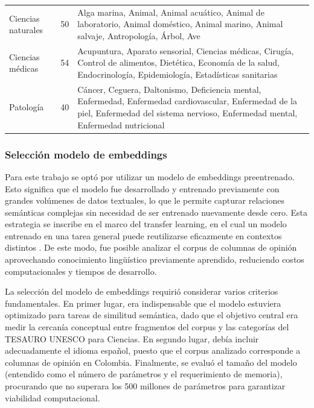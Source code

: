 \documentclass[11pt,a4paper]{article}
\begin{document}
{\begin{longtable}{p{3.5cm}P{2cm}p{9cm}}
			Ciencias naturales & 50 & Alga marina, Animal, Animal acuático, Animal de laboratorio, Animal doméstico, Animal marino, Animal salvaje, Antropología, Árbol, Ave \\
			
			Ciencias médicas & 54 & Acupuntura, Aparato sensorial, Ciencias médicas, Cirugía, Control de alimentos, Dietética, Economía de la salud, Endocrinología, Epidemiología, Estadísticas sanitarias \\
			
			Patología & 40 & Cáncer, Ceguera, Daltonismo, Deficiencia mental, Enfermedad, Enfermedad cardiovascular, Enfermedad de la piel, Enfermedad del sistema nervioso, Enfermedad mental, Enfermedad nutricional \\
			
		\end{longtable}
	}
	
	
	\subsubsection{Selección modelo de embeddings}
Para este trabajo se optó por utilizar un modelo de embeddings preentrenado. Esto significa que el modelo fue desarrollado y entrenado previamente con grandes volúmenes de datos textuales, lo que le permite capturar relaciones semánticas complejas sin necesidad de ser entrenado nuevamente desde cero. Esta estrategia se inscribe en el marco del transfer learning, en el cual un modelo entrenado en una tarea general puede reutilizarse eficazmente en contextos distintos \cite{Hosna2022}. De este modo, fue posible analizar el corpus de columnas de opinión aprovechando conocimiento lingüístico previamente aprendido, reduciendo costos computacionales y tiempos de desarrollo.

La selección del modelo de embeddings requirió considerar varios criterios fundamentales. En primer lugar, era indispensable que el modelo estuviera optimizado para tareas de similitud semántica, dado que el objetivo central era medir la cercanía conceptual entre fragmentos del corpus y las categorías del TESAURO UNESCO para Ciencias. En segundo lugar, debía incluir adecuadamente el idioma español, puesto que el corpus analizado corresponde a columnas de opinión en Colombia. Finalmente, se evaluó el tamaño del modelo (entendido como el número de parámetros y el requerimiento de memoria), procurando que no superara los 500 millones de parámetros para garantizar viabilidad computacional.
\end{document}
